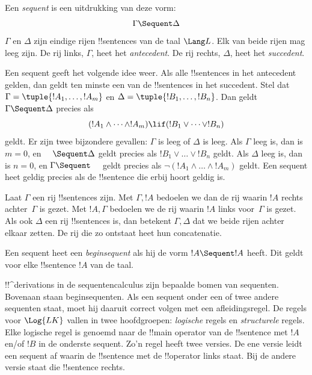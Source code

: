 \documentclass[openany]{memoir}
\begin{document}
\begin{defn}[Sequent]
Een \emph{sequent} is een uitdrukking van deze vorm:
\[
\Gamma \Sequent \Delta
\]
$\Gamma$ en $\Delta$ zijn eindige rijen !!{sentence}s van de taal
$\Lang L$. Elk van beide rijen mag leeg zijn. De rij links,
$\Gamma$, heet het \emph{antecedent}. De rij rechts, $\Delta$, heet het
\emph{succedent}.
\end{defn}

\begin{explain}
Een sequent geeft het volgende idee weer. Als alle !!{sentence}s in het
antecedent gelden, dan geldt ten minste een van de !!{sentence}s in het
succedent. Stel dat $\Gamma = \tuple{!A_1, \dots, !A_m}$ en $\Delta =
\tuple{!B_1, \dots, !B_n}$. Dan geldt $\Gamma \Sequent \Delta$ precies
als
\[
(!A_1 \land \cdots \land !A_m) \lif (!B_1 \lor \cdots \lor
!B_n)
\]
geldt. Er zijn twee bijzondere gevallen: $\Gamma$ is leeg of $\Delta$
is leeg. Als $\Gamma$ leeg is, dan is $m = 0$, en $\quad \Sequent
\Delta$ geldt precies als $!B_1 \lor \dots \lor !B_n$ geldt. Als
$\Delta$ leeg is, dan is $n = 0$, en $\Gamma \Sequent \quad$ geldt
precies als $\lnot(!A_1 \land \dots \land !A_m)$ geldt. Een sequent heet
geldig precies als de !!{sentence} die erbij hoort geldig is.
\end{explain}

Laat $\Gamma$ een rij !!{sentence}s zijn. Met $\Gamma, !A$ bedoelen we
dan de rij waarin $!A$ rechts achter~$\Gamma$ is gezet. Met $!A,
\Gamma$ bedoelen we de rij waarin $!A$ links voor~$\Gamma$ is gezet.
Als ook $\Delta$ een rij !!{sentence}s is, dan betekent $\Gamma,
\Delta$ dat we beide rijen achter elkaar zetten. De rij die zo ontstaat
heet hun concatenatie.

\begin{defn}[Beginsequent]
Een sequent heet een \emph{beginsequent} als hij
{de vorm $!A \Sequent !A$ heeft}. Dit geldt voor elke !!{sentence} $!A$
van de taal.
\end{defn}

!!^{derivation}s in de sequentencalculus zijn bepaalde bomen van
sequenten. Bovenaan staan beginsequenten. Als een sequent onder een of
twee andere sequenten staat, moet hij daaruit correct volgen met een
afleidingsregel. De regels voor $\Log{LK}$ vallen in twee hoofdgroepen:
\emph{logische} regels en \emph{structurele} regels. Elke logische regel
is genoemd naar de !!{main operator} van de !!{sentence} met $!A$
en/of $!B$ in de onderste sequent. Zo'n regel heeft twee versies. De
ene versie leidt een sequent af waarin de !!{sentence} met de
!!{operator} links staat. Bij de andere versie staat die !!{sentence}
rechts.
\endgroup
\end{document}
